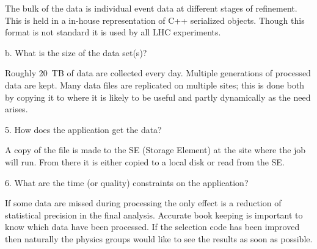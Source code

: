 \documentclass[preprint,12pt]{article}
\begin{document}
          The bulk of the data is individual event data at different stages of refinement. This is held in a in-house representation of C++ serialized objects. Though this format is not standard it is used by all LHC experiments.

         b.            What is the size of the data set(s)?

          Roughly 20~TB of data are collected every day. Multiple generations of processed data are kept. Many data files are replicated on multiple sites; this is done both by copying it to where it is likely to be useful and partly dynamically as the need arises.

   5.      How does the application get the data?

A copy of the file is made to the SE (Storage Element) at the site where the job will run. From there it is either copied to a local disk or read from the SE.

   6.      What are the time (or quality) constraints on the application?

If some data are missed during processing the only effect is a reduction of statistical precision in the final analysis. Accurate book keeping is important to know which data have been processed. If the selection code has been improved then naturally the physics groups would like to see the results as soon as possible.
\end{document}
